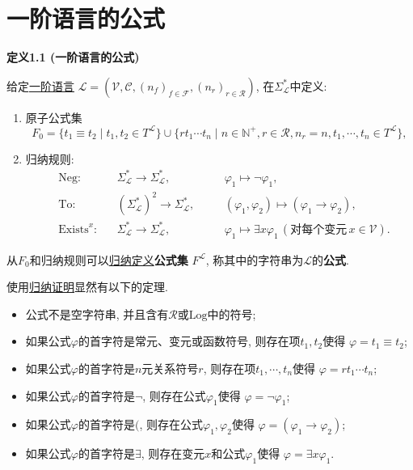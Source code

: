 \documentclass[UTF8]{ctexart}
\begin{document}
\setlength{\abovedisplayskip}{1pt}
\setlength{\belowdisplayskip}{1pt}

\section{一阶语言的公式}

\hypertarget{sec:定义1.1}{}
\noindent\textbf{定义1.1 (一阶语言的公式)}

给定\href{01 一阶语言#nameddest=sec:定义1.1}{一阶语言} $\mathcal{L}=
(\mathcal{V},\mathcal{C},(n_f)_{f\in\mathcal{F}},(n_r)_{r\in\mathcal{R}})$,
在$\Sigma_{\mathcal{L}}^*$中定义:
\begin{enumerate}
    \item 原子公式集
    \[
        F_0=\{t_1\equiv t_2\mid t_1,t_2\in T^{\mathcal{L}}\}\cup
        \{rt_1\cdots t_n\mid n\in\mathbb{N}^+,
        r\in\mathcal{R},n_r=n,t_1,\cdots,t_n\in T^{\mathcal{L}}\},
    \]
    \item 归纳规则:
    \[\begin{aligned}
        &\mathrm{Neg}:&&\Sigma_{\mathcal{L}}^*\to\Sigma_{\mathcal{L}}^*,
        \quad&&\varphi_1\mapsto\neg\varphi_1,\\[-3pt]
        &\mathrm{To}:&&(\Sigma_{\mathcal{L}}^*)^2\to\Sigma_{\mathcal{L}}^*,
        \quad&&(\varphi_1,\varphi_2)\mapsto(\varphi_1\to\varphi_2),\\[-3pt]
        &\mathrm{Exists}^x:&&\Sigma_{\mathcal{L}}^*\to\Sigma_{\mathcal{L}}^*,
        \quad&&\varphi_1\mapsto\exists x\varphi_1
        \,(\text{对每个变元}\,x\in\mathcal{V}).
    \end{aligned}\]
\end{enumerate}
从$F_0$和归纳规则可以\href{01 一阶语言#nameddest=sec:定义A1.1}{归纳定义}\textbf{公式集}
$F^{\mathcal{L}}$, 称其中的字符串为$\mathcal{L}$的\textbf{公式}.

\vspace{10pt}

使用\href{01 一阶语言#nameddest=sec:定理A1.2}{归纳证明}显然有以下的定理.
\begin{itemize}
    \item 公式不是空字符串, 并且含有$\mathcal{R}$或$\mathrm{Log}$中的符号;
    \item 如果公式$\varphi$的首字符是常元、变元或函数符号, 则存在项$t_1,t_2$使得
    $\varphi=t_1\equiv t_2$;
    \item 如果公式$\varphi$的首字符是$n$元关系符号$r$, 则存在项$t_1,\cdots,t_n$使得
    $\varphi=rt_1\cdots t_n$;
    \item 如果公式$\varphi$的首字符是$\neg$, 则存在公式$\varphi_1$使得
    $\varphi=\neg\varphi_1$;
    \item 如果公式$\varphi$的首字符是$($, 则存在公式$\varphi_1,\varphi_2$使得
    $\varphi=(\varphi_1\to\varphi_2)$;
    \item 如果公式$\varphi$的首字符是$\exists$, 则存在变元$x$和公式$\varphi_1$使得
    $\varphi=\exists x\varphi_1$.
\end{itemize}
\end{document}
